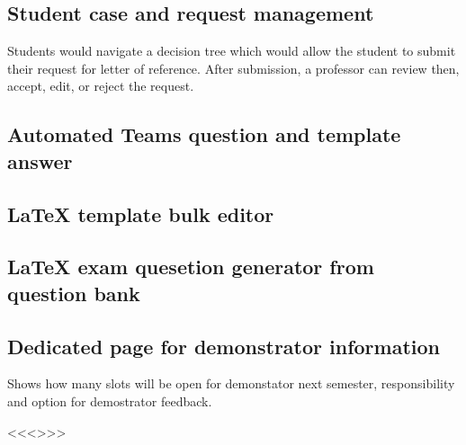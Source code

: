 \documentclass{article}
\begin{document}
\subsection{Student case and request management}

Students would navigate a decision tree which would allow the student to submit their request for letter of reference. After submission, a professor can review then, accept, edit, or reject the request.

\subsection{Automated Teams question and template answer}


\subsection{LaTeX template bulk editor}

\subsection{LaTeX exam quesetion generator from question bank}

\subsection{Dedicated page for demonstrator information}

Shows how many slots will be open for demonstator next semester, responsibility and option for demostrator feedback.

<<<>>>
\end{document}
